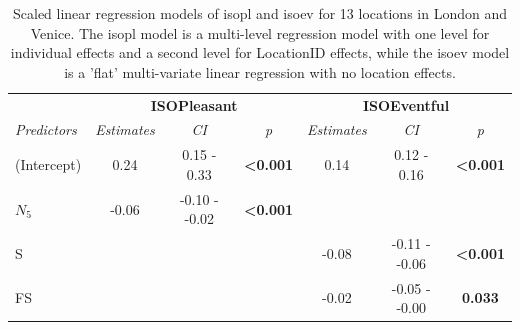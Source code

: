    \begin{table}[ht]
  \centering
\caption{Scaled linear regression models of \gls{isopl} and \gls{isoev} for 13 locations in London and Venice. The \gls{isopl} model is a multi-level regression model with one level for individual effects and a second level for LocationID effects, while the \gls{isoev} model is a 'flat' multi-variate linear regression with no location effects. \label{tab:scaled-model}}

  \def\arraystretch{.5}
  \begin{tabular}{@{}l|lccccc@{}}
    \toprule
    \multicolumn{1}{l|}{}                    &
    \multicolumn{3}{c}{\textbf{ISOPleasant}} &
    \multicolumn{3}{c}{\textbf{ISOEventful}}                                                                                                                                                           \\
    \textit{Predictors}                      &
    \multicolumn{1}{c}{\textit{Estimates}}   &
    \textit{CI}                              &
    \textit{p}                               &
    \textit{Estimates}                       &
    \textit{CI}                              &
    \textit{p}                                                                                                                                                                                         \\ \midrule
    (Intercept)                              &
    \multicolumn{1}{c}{0.24}                 &
    0.15 - 0.33                              &
    \textbf{\textless{}0.001}                &
    0.14                                     &
    0.12 - 0.16                              &
    \textbf{\textless{}0.001}                                                                                                                                                                          \\
    $N_5$                                    & \multicolumn{1}{c}{-0.06}                               & -0.10 - -0.02 & \textbf{\textless{}0.001} &       &               &                           \\
    S                                        & \multicolumn{1}{c}{}                                    &               &                           & -0.08 & -0.11 - -0.06 & \textbf{\textless{}0.001} \\
    FS                                       & \multicolumn{1}{c}{}                                    &               &                           & -0.02 & -0.05 - -0.00 & \textbf{0.033}            \\

\end{tabular}
\end{table}
